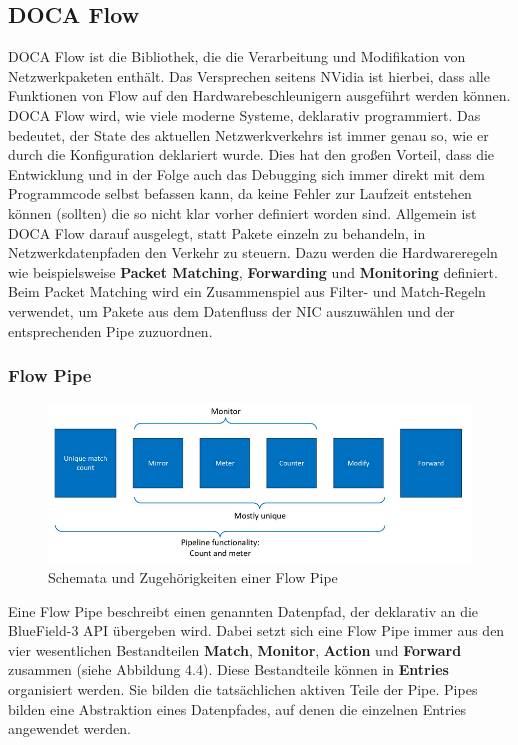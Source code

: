 \subsection{DOCA Flow}
DOCA Flow ist die Bibliothek, die die Verarbeitung und Modifikation von Netzwerkpaketen enthält. Das Versprechen seitens NVidia ist hierbei, dass alle Funktionen von Flow auf den Hardwarebeschleunigern ausgeführt werden können. DOCA Flow wird, wie viele moderne Systeme, deklarativ programmiert. Das bedeutet, der State des aktuellen Netzwerkverkehrs ist immer genau so, wie er durch die Konfiguration deklariert wurde. Dies hat den großen Vorteil, dass die Entwicklung und in der Folge auch das Debugging sich immer direkt mit dem Programmcode selbst befassen kann, da keine Fehler zur Laufzeit entstehen können (sollten) die so nicht klar vorher definiert worden sind.
Allgemein ist DOCA Flow darauf ausgelegt, statt Pakete einzeln zu behandeln, in Netzwerkdatenpfaden den Verkehr zu steuern. Dazu werden die Hardwareregeln wie beispielsweise \textbf{Packet Matching}, \textbf{Forwarding} und \textbf{Monitoring} definiert. Beim Packet Matching wird ein Zusammenspiel aus Filter- und Match-Regeln verwendet, um Pakete aus dem Datenfluss der NIC auszuwählen und der entsprechenden Pipe zuzuordnen. \cite{nvidia_doca_flow_2025}
\subsubsection{Flow Pipe}
\begin{figure}
    \centering
    \includegraphics[width=1\linewidth]{images/pipe.png}
    \caption{Schemata und Zugehörigkeiten einer Flow Pipe \cite{nvidia_doca_flow_2025}}
    \label{fig:enter-label}
\end{figure}
Eine Flow Pipe beschreibt einen genannten Datenpfad, der deklarativ an die BlueField-3 API übergeben wird. Dabei setzt sich eine Flow Pipe immer aus den vier wesentlichen Bestandteilen \textbf{Match}, \textbf{Monitor}, \textbf{Action} und \textbf{Forward} zusammen (siehe Abbildung 4.4). Diese Bestandteile können in \textbf{Entries} organisiert werden. Sie bilden die tatsächlichen aktiven Teile der Pipe. Pipes bilden eine Abstraktion eines Datenpfades, auf denen die einzelnen Entries angewendet werden.

